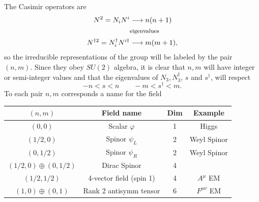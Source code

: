 The Casimir operators are
\begin{align*}
    N^2=N_iN^i &\longrightarrow n(n+1)\\
	   &\text{\footnotesize eigenvalues}\\
    N^{\dagger 2}=N^\dagger_iN^{i\dagger} &\longrightarrow m(m+1),
\end{align*}
so the irreducible representations of the group will be labeled by the pair $(n,m)$.
Since they obey $SU(2)$ algebra, it is clear that $n,m$ will have integer or
semi-integer values and that the eigenvalues of
$N_3,N_3^{\dagger}$, $s$ and $s^\dagger$, will respect
$$-n<s<n\qquad-m<s^\dagger<m.$$
To each pair $n,m$ corresponds a name for the field
\begin{table}[ht!]
    \centering
    \begin{tabular}{c|c|c|c}
	$(n,m)$&Field name&Dim&Example\\ \hline
	$(0,0)$&Scalar $\varphi$&1&Higgs \\
	$(1/2,0)$&Spinor $\psi_L$&2&Weyl Spinor\\
	$(0,1/2)$&Spinor $\psi_R$&2&Weyl Spinor\\
	$(1/2,0)\oplus(0,1/2)$&Dirac Spinor&4&\\
	$(1/2,1/2)$&4-vector field (spin 1)&4&$A^\mu$ EM\\
	$(1,0)\oplus(0,1)$&Rank 2 antisymm tensor&6&$F^{\mu\nu}$ EM
    \end{tabular}
\end{table}

